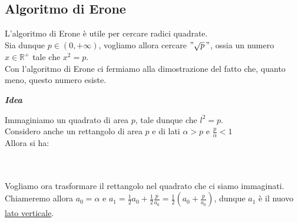 \documentclass{article}
\theoremstyle{definition}
\begin{document}
\subsection{Algoritmo di Erone}
L'algoritmo di Erone è utile per cercare radici quadrate.
\\
Sia dunque $p \in (0,+\infty)$, vogliamo allora cercare $"\sqrt{p}\,"$, ossia un numero $x \in \mathbb{R^+}$ tale che $x^2=p$.
\\
Con l'algoritmo di Erone ci fermiamo alla dimostrazione del fatto che, quanto meno, questo numero esiste.
\begin{center}
    \textbf{\textit{Idea}}
\end{center}
Immaginiamo un quadrato di area $p$, tale dunque che $l^2=p$.
\\
Considero anche un rettangolo di area $p$ e di lati $\alpha>p$ e $\frac{p}{\alpha} < 1$
\\
Allora si ha:
\\
\\
\\
Vogliamo ora trasformare il rettangolo nel quadrato che ci siamo immaginati.
\\
Chiameremo allora $a_0=\alpha$ e $a_1=\frac{1}{2}a_0+\frac{1}{2}\frac{p}{a_0}=\frac{1}{2}(a_0+\frac{p}{a_0})$, dunque $a_1$ è il nuovo \underline{lato verticale}.
\end{document}
